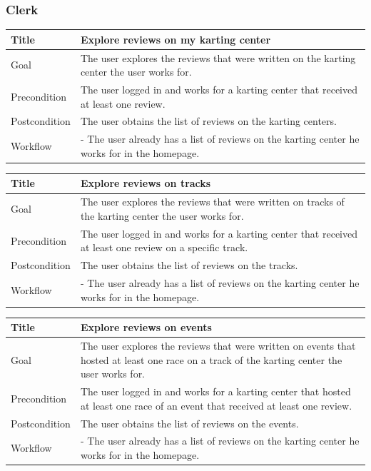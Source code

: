 \documentclass{beamer}
\begin{document}
\begin{frame}
    \frametitle{Clerk}
    \begin{table}
        \tiny
        \begin{tabular}{|p{2cm}|p{6cm}|}
        \hline  
        Title & \textbf{Explore reviews on my karting center} \\
        \hline
        Goal & The user explores the reviews that were written on the karting center the user works for. \\
        \hline
        Precondition & The user logged in and works for a karting center that received
        at least one review. \\
        \hline
        Postcondition & The user obtains the list of reviews on the karting centers. \\
        \hline
        Workflow &
        - The user already has a list of reviews on the karting center he works for in the homepage. \\
        \hline
        \end{tabular}
\end{table}

\begin{table}
    \tiny
    \begin{tabular}{|p{2cm}|p{6cm}|}
    \hline  
    Title & \textbf{Explore reviews on tracks} \\
    \hline
    Goal & The user explores the reviews that were written on tracks of the karting center the user works for. \\
    \hline
    Precondition & The user logged in and works for a karting center that received
    at least one review on a specific track. \\
    \hline
    Postcondition & The user obtains the list of reviews on the tracks. \\
    \hline
    Workflow &
    - The user already has a list of reviews on the karting center he works for in the homepage. \\
    \hline
    \end{tabular}
\end{table}

\begin{table}
    \tiny
    \begin{tabular}{|p{2cm}|p{6cm}|}
    \hline  
    Title & \textbf{Explore reviews on events} \\
    \hline
    Goal & The user explores the reviews that were written on events that hosted at least one race
    on a track of the karting center the user works for. \\
    \hline
    Precondition & The user logged in and works for a karting center that hosted at least one race 
    of an event that received at least one review. \\
    \hline
    Postcondition & The user obtains the list of reviews on the events. \\
    \hline
    Workflow &
    - The user already has a list of reviews on the karting center he works for in the homepage. \\
    \hline
    \end{tabular}
\end{table}


\end{frame}
\end{document}
